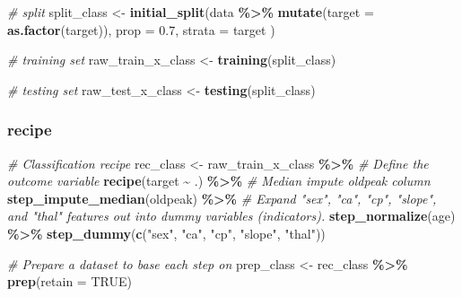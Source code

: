 \documentclass[
]{book}
\newenvironment{Shaded}{\begin{snugshade}}{\end{snugshade}}
\newcommand{\AttributeTok}[1]{\textcolor[rgb]{0.13,0.29,0.53}{#1}}
\newcommand{\CommentTok}[1]{\textcolor[rgb]{0.56,0.35,0.01}{\textit{#1}}}
\newcommand{\ConstantTok}[1]{\textcolor[rgb]{0.56,0.35,0.01}{#1}}
\newcommand{\FloatTok}[1]{\textcolor[rgb]{0.00,0.00,0.81}{#1}}
\newcommand{\FunctionTok}[1]{\textcolor[rgb]{0.13,0.29,0.53}{\textbf{#1}}}
\newcommand{\NormalTok}[1]{#1}
\newcommand{\OtherTok}[1]{\textcolor[rgb]{0.56,0.35,0.01}{#1}}
\newcommand{\SpecialCharTok}[1]{\textcolor[rgb]{0.81,0.36,0.00}{\textbf{#1}}}
\newcommand{\StringTok}[1]{\textcolor[rgb]{0.31,0.60,0.02}{#1}}
\begin{document}
\begin{Shaded}
\begin{Highlighting}[]
\CommentTok{\# split}
\NormalTok{split\_class }\OtherTok{\textless{}{-}} \FunctionTok{initial\_split}\NormalTok{(data }\SpecialCharTok{\%\textgreater{}\%}
  \FunctionTok{mutate}\NormalTok{(}\AttributeTok{target =} \FunctionTok{as.factor}\NormalTok{(target)),}
\AttributeTok{prop =} \FloatTok{0.7}\NormalTok{,}
\AttributeTok{strata =}\NormalTok{ target}
\NormalTok{)}

\CommentTok{\# training set}
\NormalTok{raw\_train\_x\_class }\OtherTok{\textless{}{-}} \FunctionTok{training}\NormalTok{(split\_class)}

\CommentTok{\# testing set}
\NormalTok{raw\_test\_x\_class }\OtherTok{\textless{}{-}} \FunctionTok{testing}\NormalTok{(split\_class)}
\end{Highlighting}
\end{Shaded}

\subsubsection{recipe}\label{recipe-1}

\begin{Shaded}
\begin{Highlighting}[]
\CommentTok{\# Classification recipe}
\NormalTok{rec\_class }\OtherTok{\textless{}{-}}\NormalTok{ raw\_train\_x\_class }\SpecialCharTok{\%\textgreater{}\%}
  \CommentTok{\# Define the outcome variable}
  \FunctionTok{recipe}\NormalTok{(target }\SpecialCharTok{\textasciitilde{}}\NormalTok{ .) }\SpecialCharTok{\%\textgreater{}\%}
  \CommentTok{\# Median impute oldpeak column}
  \FunctionTok{step\_impute\_median}\NormalTok{(oldpeak) }\SpecialCharTok{\%\textgreater{}\%}
  \CommentTok{\# Expand "sex", "ca", "cp", "slope", and "thal" features out into dummy variables (indicators).}
  \FunctionTok{step\_normalize}\NormalTok{(age) }\SpecialCharTok{\%\textgreater{}\%}
  \FunctionTok{step\_dummy}\NormalTok{(}\FunctionTok{c}\NormalTok{(}\StringTok{"sex"}\NormalTok{, }\StringTok{"ca"}\NormalTok{, }\StringTok{"cp"}\NormalTok{, }\StringTok{"slope"}\NormalTok{, }\StringTok{"thal"}\NormalTok{))}

\CommentTok{\# Prepare a dataset to base each step on}
\NormalTok{prep\_class }\OtherTok{\textless{}{-}}\NormalTok{ rec\_class }\SpecialCharTok{\%\textgreater{}\%} \FunctionTok{prep}\NormalTok{(}\AttributeTok{retain =} \ConstantTok{TRUE}\NormalTok{)}
\end{Highlighting}
\end{Shaded}
\end{document}

